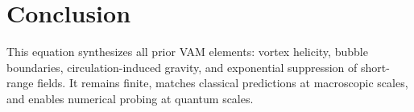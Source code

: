 \documentclass[12pt]{article}
\begin{document}
\section*{Conclusion}
This equation synthesizes all prior VAM elements: vortex helicity, bubble boundaries, circulation-induced gravity, and exponential suppression of short-range fields. It remains finite, matches classical predictions at macroscopic scales, and enables numerical probing at quantum scales.


\ifdefined\standalonechapter
\else
    
    
    
\end{document}
